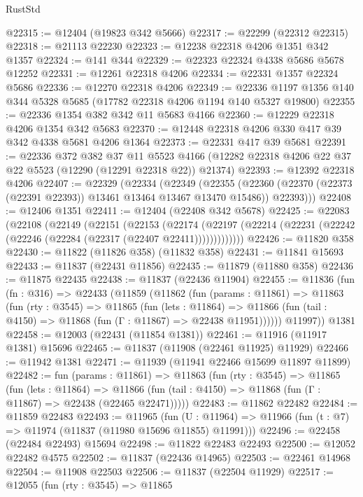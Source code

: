 \begin{lexlean}{RustStd}
\begin{coremodule}
{\begin{coremodule}
{{{{{{{{{{{{{{{{{{{{{{{{{{{{{{{{{{{{{{{{{{{{{{{{{{@22315 := @12404 (@19823 @342 @5666)
@22317 := @22299 (@22312 @22315)
@22318 := @21113 @22230
@22323 := @12238 @22318 @4206 @1351 @342 @1357
@22324 := @141 @344
@22329 := @22323 @22324 @4338 @5686 @5678 @12252
@22331 := @12261 @22318 @4206
@22334 := @22331 @1357 @22324 @5686
@22336 := @12270 @22318 @4206
@22349 := @22336 @1197 @1356 @140 @344 @5328 @5685 (@17782 @22318 @4206 @1194 @140 @5327 @19800)
@22355 := @22336 @1354 @382 @342 @11 @5683 @4166
@22360 := @12229 @22318 @4206 @1354 @342 @5683
@22370 := @12448 @22318 @4206 @330 @417 @39 @342 @4338 @5681 @4206 @1364
@22373 := @22331 @417 @39 @5681
@22391 := @22336
    @372
    @382
    @37
    @11
    @5523
    @4166
    (@12282 @22318 @4206 @22 @37 @22 @5523 (@12290 (@12291 @22318 @22)) @21374)
@22393 := @12392 @22318 @4206
@22407 := @22329
    (@22334
      (@22349
        (@22355
          (@22360 (@22370 (@22373 (@22391 @22393)) @13461 @13464 @13467 @13470 @15486))
          @22393)))
@22408 := @12406 @1351
@22411 := @12404 (@22408 @342 @5678)
@22425 := @22083
    (@22108
      (@22149
        (@22151
          (@22153
            (@22174
              (@22197 (@22214 (@22231 (@22242 (@22246 (@22284 (@22317 (@22407 @22411)))))))))))))
@22426 := @11820 @358
@22430 := @11822 (@11826 @358) (@11832 @358)
@22431 := @11841 @15693
@22433 := @11837 (@22431 @11856)
@22435 := @11879 (@11880 @358)
@22436 := @11875 @22435
@22438 := @11837 (@22436 @11904)
@22455 := @11836
    (fun (fn : @316) =>
    @22433
      (@11859
        (@11862
          (fun (params : @11861) =>
          @11863
            (fun (rty : @3545) =>
            @11865
              (fun (lets : @11864) =>
              @11866 (fun (tail : @4150) => @11868 (fun (Γ : @11867) => @22438 @11951))))))
        @11997))
    @1381
@22458 := @12003 (@22431 (@11854 @1381))
@22461 := @11916 (@11917 @1381) @15696
@22465 := @11837 (@11908 (@22461 @11925) @11929)
@22466 := @11942 @1381
@22471 := @11939 (@11941 @22466 @15699 @11897 @11899)
@22482 := fun (params : @11861) =>
  @11863
    (fun (rty : @3545) =>
    @11865
      (fun (lets : @11864) =>
      @11866 (fun (tail : @4150) => @11868 (fun (Γ : @11867) => @22438 (@22465 @22471)))))
@22483 := @11862 @22482
@22484 := @11859 @22483
@22493 := @11965
    (fun (U : @11964) => @11966 (fun (t : @7) => @11974 (@11837 (@11980 @15696 @11855) @11991)))
@22496 := @22458 (@22484 @22493) @15694
@22498 := @11822 @22483 @22493
@22500 := @12052 @22482 @4575
@22502 := @11837 (@22436 @14965)
@22503 := @22461 @14968
@22504 := @11908 @22503
@22506 := @11837 (@22504 @11929)
@22517 := @12055
    (fun (rty : @3545) =>
    @11865
}}}}}}}}}}}}}}}}}}}}}}}}}}}}}}}}}}}}}}}}}}}}}}}}}}
\end{coremodule}}
\end{coremodule}
\end{lexlean}
